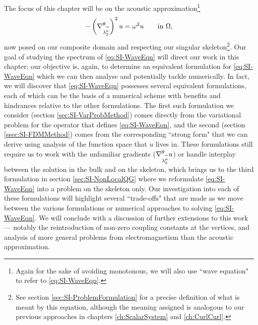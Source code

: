 The focus of this chapter will be on the acoustic approximation\footnote{Again for the sake of avoiding monotonous, we will also use ``wave equation" to refer to \eqref{eq:SI-WaveEqn}.}
\begin{align} \label{eq:SI-WaveEqn}
	-\left( \nabla^{\theta}_{\lambda_2^{\widetilde{\mu}}} \right)^2 u = \omega^2 u \qquad\text{in } \Omega,
\end{align}
now posed on our composite domain and respecting our singular skeleton\footnote{See section \ref{sec:SI-ProblemFormulation} for a precise definition of what is meant by this equation, although the meaning assigned is analogous to our previous approaches in chapters \ref{ch:ScalarSystem} and \ref{ch:CurlCurl}.}.
Our goal of studying the spectrum of \eqref{eq:SI-WaveEqn} will direct our work in this chapter; our objective is, again, to determine an equivalent formulation for \eqref{eq:SI-WaveEqn} which we can then analyse and potentially tackle numerically.
In fact, we will discover that \eqref{eq:SI-WaveEqn} possesses several equivalent formulations, each of which can be the basis of a numerical scheme with benefits and hindrances relative to the other formulations.
The first such formulation we consider (section \ref{sec:SI-VarProbMethod}) comes directly from the variational problem for the operator that defines \eqref{eq:SI-WaveEqn}, and the second (section \ref{ssec:SI-FDMMethod}) comes from the corresponding ``strong form" that we can derive using analysis of the function space that $u$ lives in.
These formulations still require us to work with the unfamiliar gradients ($\nabla^{\theta}_{\lambda_2^{\widetilde{\mu}}}u$) or handle interplay between the solution in the bulk and on the skeleton, which brings us to the third formulation in section \ref{sec:SI-NonLocalQG} where we reformulate \eqref{eq:SI-WaveEqn} into a problem on the skeleton only.
Our investigation into each of these formulations will highlight several ``trade-offs" that are made as we move between the various formulations or numerical approaches to solving \eqref{eq:SI-WaveEqn}.
We will conclude with a discussion of further extensions to this work --- notably the reintroduction of non-zero coupling constants at the vertices, and analysis of more general problems from electromagnetism than the acoustic approximation.
